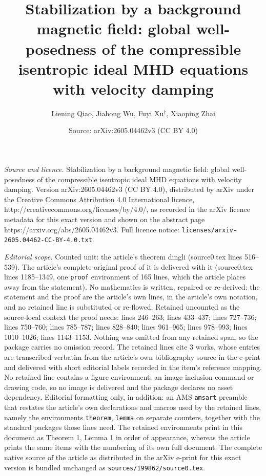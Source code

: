 \documentclass[10pt,a4paper]{amsart}
\title{Stabilization by a background magnetic field: global well-posedness of the compressible isentropic ideal MHD equations with velocity damping}
\author{Liening Qiao, Jiahong Wu, Fuyi Xu$^{\dag}$, Xiaoping Zhai}
\date{Source: arXiv:2605.04462v3 (CC BY 4.0)}
\begin{document}
\maketitle

\noindent\emph{Source and licence.} Stabilization by a background magnetic field: global well-posedness of the compressible isentropic ideal MHD equations with velocity damping. Version arXiv:2605.04462v3 (CC BY 4.0), distributed by arXiv under the Creative Commons Attribution 4.0 International licence, http://creativecommons.org/licenses/by/4.0/, as recorded in the arXiv licence metadata for this exact version and shown on the abstract page https://arxiv.org/abs/2605.04462v3. Full licence notice: \texttt{licenses/arxiv-2605.04462-CC-BY-4.0.txt}.\par\smallskip

\noindent\textit{Editorial scope.} Counted unit: the article's theorem dingli (source0.tex lines 516--539). The article's complete original proof of it is delivered with it (source0.tex lines 1185--1349, one \texttt{proof} environment of 165 lines, which the article places away from the statement). No mathematics is written, repaired or re-derived: the statement and the proof are the article's own lines, in the article's own notation, and no retained line is substituted or re-flowed.  Retained uncounted as the source-local context the proof needs: lines 246--263; lines 433--437; lines 727--736; lines 750--760; lines 785--787; lines 828--840; lines 961--965; lines 978--993; lines 1010--1026; lines 1143--1153.  Nothing was omitted from any retained span, so the package carries no omission record.  The retained lines cite 3 works, whose entries are transcribed verbatim from the article's own bibliography source in the e-print and delivered with short editorial labels recorded in the item's reference mapping.  No retained line contains a figure environment, an image-inclusion command or drawing code, so no image is delivered and the package declares no asset dependency.  Editorial formatting only, in addition: an AMS \texttt{amsart} preamble that restates the article's own declarations and macros used by the retained lines, namely the environments \texttt{theorem}, \texttt{lemma} on separate counters, together with the standard packages those lines need.  The retained environments print in this document as Theorem 1, Lemma 1 in order of appearance, whereas the article prints the same items with the numbering of its own full document.  The complete native source of the article as distributed in the arXiv e-print for this exact version is bundled unchanged as \texttt{sources/199862/source0.tex}.
\end{document}
